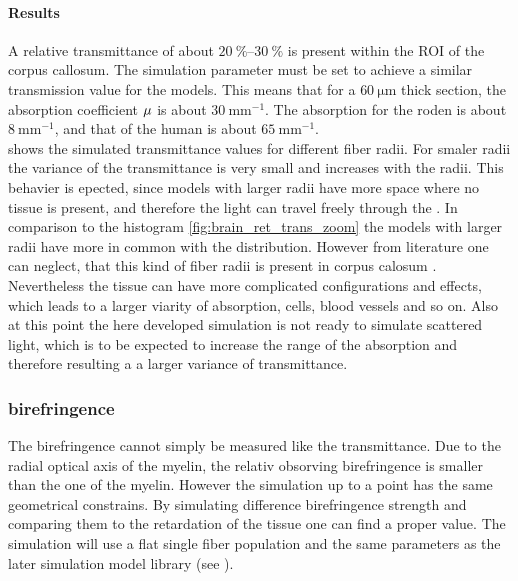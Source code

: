 \paragraph{Results}
A relative transmittance of about $\SIrange{20}{30}{\percent}$ is present within the \ac{ROI} of the corpus callosum. 
The simulation parameter must be set to achieve a similar transmission value for the models.
This means that for a $\SI{60}{\micro\meter}$ thick section, the absorption coefficient $\textnormal{$\mu$}{}$ is about $\SI{30}{\milli\meter\tothe{-1}}$. 
The absorption for the roden is about $\SI{8}{\milli\meter\tothe{-1}}$, and that of the human is about $\SI{65}{\milli\meter\tothe{-1}}$.
\\
%
 shows the simulated transmittance values for different fiber radii. 
For smaler radii the variance of the transmittance is very small \dummy{} and increases with the radii.
This behavier is epected, since models with larger radii have more space where no tissue is present, and therefore the light can travel freely through the .
In comparison to the histogram \cref{fig:brain_ret_trans_zoom} the models with larger radii have more in common with the distribution.
However from literature one can neglect, that this kind of fiber radii is present in corpus calosum \dummy{}.
Nevertheless the tissue can have more complicated configurations and effects, which leads to a larger viarity of absorption, \eg{} cells, blood vessels and so on.
Also at this point the here developed simulation is not ready to simulate scattered light, which is to be expected to increase the range of the absorption and therefore resulting a a larger variance of transmittance.
% 
% 
%
\subsubsection{birefringence}
% 
The birefringence cannot simply be measured like the transmittance.
Due to the radial optical axis of the myelin, the relativ obsorving birefringence is smaller than the one of the myelin.
However the simulation up to a point has the same geometrical constrains.
By simulating difference birefringence strength and comparing them to the retardation of the tissue one can find a proper value.
The simulation will use a flat single fiber population and the same parameters as the later simulation model library (see \dummy{}).
% 
